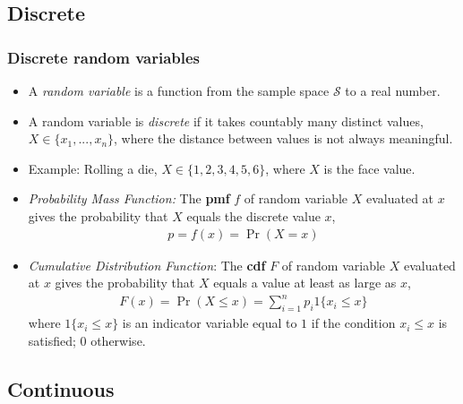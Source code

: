 

\subsection{Discrete}


\begin{frame}
\frametitle{Discrete random variables}
\begin{itemize}
\item A \emph{random variable} is a function from the sample space $\mathcal{S}$ to a real number.
\item A random variable is \emph{discrete} if it takes countably many distinct values, $X \in \{x_1, ..., x_n\}$, where the distance between values is not always meaningful.
\item Example: Rolling a die, $X \in \{1, 2, 3, 4, 5, 6\}$, where $X$ is the face value.
\item \emph{Probability Mass Function:} The \textbf{pmf} $f$ of random variable $X$ evaluated at $x$ gives the probability that $X$ equals the discrete value $x$,
\begin{align*}
p = f(x) = \Pr(X=x)
\end{align*}
\item \emph{Cumulative Distribution Function}: The \textbf{cdf} $F$ of random variable $X$ evaluated at $x$ gives the probability that $X$ equals a value at least as large as $x$,
\begin{align*}
F(x) = \Pr(X \leq x) = \sum_{i=1}^n p_i 1\{x_i \leq x\}
\end{align*}
where $1\{x_i \leq x \}$ is an indicator variable equal to $1$ if the condition $x_i \leq x$ is satisfied; $0$ otherwise. 
\end{itemize}
\end{frame}


\subsection{Continuous}


